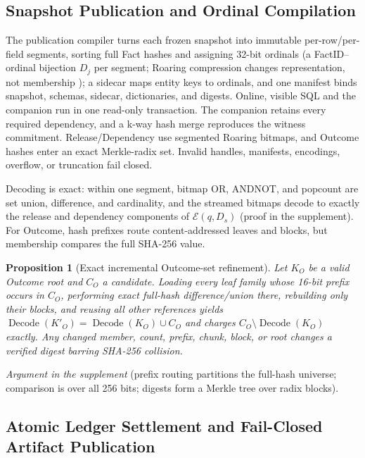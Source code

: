 \documentclass[10pt,journal,compsoc]{IEEEtran}
\newcommand{\code}[1]{\texttt{\detokenize{#1}}}
\newcommand{\effect}{\mathcal{E}}
\newtheorem{proposition}{Proposition}
\begin{document}
\subsection{Snapshot Publication and Ordinal Compilation}

The publication compiler turns each frozen snapshot into immutable
per-row/per-field segments, sorting full Fact hashes and assigning 32-bit
ordinals (a FactID--ordinal bijection $D_j$ per segment; Roaring
compression changes representation, not membership
\cite{chambi2016roaring}); a sidecar maps entity keys to ordinals, and one
manifest binds snapshot, schemas, sidecar, dictionaries, and digests.
Online, visible SQL and the companion run in one read-only
\code{REPEATABLE READ} transaction. The companion retains every required
dependency, and a k-way hash merge reproduces the witness commitment.
Release/Dependency use segmented Roaring bitmaps, and Outcome hashes enter an
exact Merkle-radix set. Invalid handles, manifests, encodings, overflow,
or truncation fail closed.

Decoding is exact: within one segment, bitmap OR, ANDNOT, and popcount are
set union, difference, and cardinality, and the streamed bitmaps decode to
exactly the release and dependency components of $\effect(q,D_s)$ (proof
in the supplement). For Outcome, hash prefixes route content-addressed
leaves and blocks, but membership compares the full SHA-256 value.

\begin{proposition}[Exact incremental Outcome-set refinement]
\label{thm:outcome-radix-refinement}
Let $K_O$ be a valid Outcome root and $C_O$ a candidate. Loading every
leaf family whose 16-bit prefix occurs in $C_O$, performing exact full-hash
difference/union there, rebuilding only their blocks, and
reusing all other references yields
$\operatorname{Decode}(K'_O)=\operatorname{Decode}(K_O)\cup C_O$ and charges
$C_O\setminus\operatorname{Decode}(K_O)$ exactly. Any changed member, count,
prefix, chunk, block, or root changes a verified digest barring
SHA-256 collision.
\end{proposition}
\emph{Argument in the supplement} (prefix routing partitions the full-hash
universe; comparison is over all 256 bits; digests form a Merkle tree
\cite{merkle1987signature} over radix blocks).

\subsection{Atomic Ledger Settlement and Fail-Closed Artifact Publication}
\end{document}
